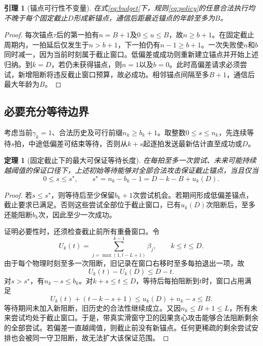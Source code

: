 \documentclass[UTF8,a4paper,zihao=5,fontset=windows]{ctexart}
\newtheorem{theorem}{定理}
\newtheorem{lemma}{引理}
\begin{document}
\begin{lemma}[锚点可行性不变量]\label{lem:invariant}
在式\eqref{eq:budget}下，规则\eqref{eq:policy}的任意合法执行均不晚于每个固定截止$D$形成新锚点，通信后距最近锚点的年龄至多为$B$。
\end{lemma}
\begin{proof}
每次锚点$\tau$后的第一拍有$n=B+1$及$0\le u\le B$，故$n\ge b+1$。在固定截止周期内，一拍延后仅发生于$n>b+1$，下一拍仍有$n-1\ge b+1$。一次失败使$n$和$b$同时减一，因为当前时刻属于截止窗口。低偏差或成功则重新建立锚点并开始上述归纳。到$k=D$，若仍未获得锚点，则$n=1$以及$b=0$。此时高偏差请求必须尝试，新增阻断将违反截止窗口预算，故必成功。相邻锚点间隔至多$B+1$，通信后最大年龄为$B$。
\end{proof}

\subsection{必要充分等待边界}
考虑当前$\gamma_k=1$、合法历史及可行前缀$n_k\ge b_k+1$。取整数$0\le s\le n_k$，先连续等待$s$拍，中途低偏差可结束等待，否则从$k+s$起逐拍发送最新估计直至成功或$D$。

\begin{theorem}[固定截止下的最大可保证等待长度]\label{thm:sharp}
在每拍至多一次尝试、未来可能持续越阈值的保证口径下，上述初始等待能够对全部合法攻击保证截止锚点，当且仅当
\begin{equation}
0\le s\le s^\star,\qquad
s^\star=n_k-b_k-1=D-k-B+u_k(D).
\label{eq:sharp}
\end{equation}
\end{theorem}
\begin{proof}
若$s\le s^\star$，则等待后至少保留$b_k+1$次尝试机会。若期间形成低偏差锚点，截止要求已满足。否则这些尝试全部位于截止窗口，已有$u_k(D)$次阻断后，至多还能阻断$b_k$次，因此至少一次成功。

证明必要性时，还须检查截止前所有重叠窗口。令
\[
U_k(t)=\sum_{j=\max(1,t-L+1)}^{k-1}\beta_j,\qquad k\le t\le D.
\]
由于每个物理时刻至多一次阻断，旧记录在窗口右移时至多每拍退出一项，故
\begin{equation}
U_k(t)-U_k(D)\le D-t.
\label{eq:overlap}
\end{equation}
对$s>s^\star$，有$n_k-s\le b_k$。对$k+s\le t\le D$，等待后每拍阻断到$t$时，窗口占用满足
\begin{equation}
U_k(t)+(t-k-s+1)\le u_k(D)+n_k-s\le B.
\label{eq:extension}
\end{equation}
等待期间未加入新阻断，旧历史的合法性继续成立。又因$n_k\le B+1\le L$，所有未来尝试均处于截止窗口。于是，带真实滑窗守卫的因果贪心攻击能够合法阻断剩余的全部尝试。若偏差一直越阈值，则截止前没有新锚点。任何更稀疏的剩余尝试安排也会被同一守卫阻断，故无法扩大该保证范围。
\end{proof}
\end{document}
